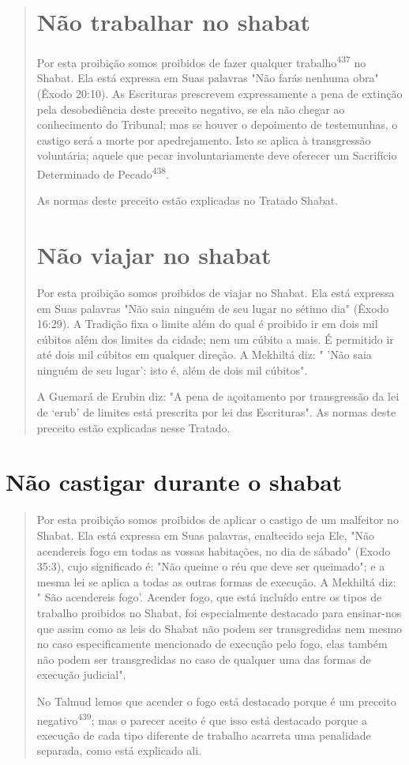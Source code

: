 \begin{quote}
\section{Não trabalhar no shabat}

Por esta proibição somos proibidos de fazer qualquer
trabalho\textsuperscript{437} no Shabat. Ela está expressa em Suas
palavras "Não farás nenhuma obra" (Êxodo 20:10). As Escrituras
prescrevem expressamente a pena de extinção pela deso­bediência deste
preceito negativo, se ela não chegar ao conhecimento do Tri­bunal; mas
se houver o depoimento de testemunhas, o castigo será a morte por
apedrejamento. Isto se aplica à transgressão voluntária; aquele que
pecar invo­luntariamente deve oferecer um Sacrifício Determinado de
Pecado\textsuperscript{438}.

As normas deste preceito estão explicadas no Tratado Shabat.

\section{Não viajar no shabat}

Por esta proibição somos proibidos de viajar no Shabat. Ela está
ex­pressa em Suas palavras "Não saia ninguém de seu lugar no sétimo dia"
(Êxodo 16:29). A Tradição fixa o limite além do qual é proibido ir em
dois mil cúbitos além dos limites da cidade; nem um cúbito a mais. É
permitido ir até dois mil cúbitos em qualquer direção. A Mekhiltá diz: "
'Não saia ninguém de seu lu­gar': isto é, além de dois mil cúbitos".

A Guemará de Erubin diz: "A pena de açoitamento por transgressão da lei
de `erub' de limites está prescrita por lei das Escrituras". As normas
deste preceito estão explicadas nesse Tratado.
\end{quote}

\section{Não castigar durante o shabat}

\begin{quote}
Por esta proibição somos proibidos de aplicar o castigo de um mal­feitor
no Shabat. Ela está expressa em Suas palavras, enaltecido seja Ele, "Não
acendereis fogo em todas as vossas habitações, no dia de sábado" (Exodo
35:3), cujo significado é: "Não queime o réu que deve ser queimado"; e a
mesma lei se aplica a todas as outras formas de execução. A Mekhiltá
diz: " São acende­reis fogo'. Acender fogo, que está incluído entre os
tipos de trabalho proibidos no Shabat, foi especialmente destacado para
ensinar-nos que assim como as leis do Shabat não podem ser transgredidas
nem mesmo no caso especificamente mencionado de execução pelo fogo, elas
também não podem ser transgredidas no caso de qualquer uma das formas de
execução judicial".

No Talmud lemos que acender o fogo está destacado porque é um preceito
negativo\textsuperscript{439}; mas o parecer aceito é que isso está
destacado porque a execução de cada tipo diferente de trabalho acarreta
uma penalidade separada, como está explicado ali.
\end{quote}

